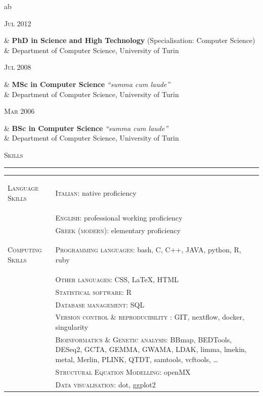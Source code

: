 \documentclass[a4paper,10pt]{article}
\newcommand{\mediumtitle}[1]{
	\vspace{0.2cm}
	{\noindent
	\Large \textsc{#1}\\[-2ex]
	\hrule
	\vspace{0.2cm}}
}
\newenvironment{doubletablelist}
{
	\begin{longtable}[!h]{AB}}{\end{longtable}
}
\newcommand{\dtlist}[2]{
\hspace{-3cm}
\noindent
	\begin{minipage}{0.22\textwidth}
	\begin{flushright}
	\textsc{#1}
	\end{flushright}
	\end{minipage}
	& #2 \medskip \\ 
}
\newenvironment{singletablelist}
{	
	\begin{longtable}[!h]{ab}}{\end{longtable}
}
\newcommand{\stlist}[2]{
	\hspace{-3cm}
	\noindent
	\begin{minipage}{0.24\textwidth}
	\begin{flushright}
	\textsc{#1}
	\end{flushright}
	\end{minipage}
	& #2 \medskip \\ 
}
\begin{document}
\begin{singletablelist}

	\stlist{Jul 2012}{\textbf{PhD in Science and High Technology} (Specialisation: Computer Science) \\
	& Department of Computer Science, University of Turin
	}
	
	\stlist{Jul 2008}{\textbf{MSc in Computer Science} \emph{``summa cum laude''} \\
	& Department of Computer Science, University of Turin
	}

	\stlist{Mar 2006}{\textbf{BSc in Computer Science}  \emph{``summa cum laude''} \\
	& Department of Computer Science, University of Turin
	}

\end{singletablelist}


\mediumtitle{Skills}

\begin{doubletablelist}
	\dtlist{Language Skills}{\textsc{Italian}: native proficiency \\ 
							&\textsc{English}: professional working proficiency\\
							&\textsc{Greek (modern)}: elementary proficiency}
	\dtlist{Computing Skills}{\textsc{Programming languages}: bash, C, C++, JAVA, python, R, ruby \\ %
							&\textsc{Other languages}: CSS, \LaTeX, HTML\\ %
							&\textsc{Statistical software}: R\\ %
							&\textsc{Database management}: SQL\\
							&\textsc{Version control \& reproducibility }: GIT, nextflow, docker, singularity\\
							&\textsc{Bioinformatics \& Genetic analysis}: BBmap, BEDTools, DESeq2, GCTA, GEMMA, GWAMA, LDAK, limma, lmekin, metal, Merlin, PLINK, QTDT, samtools, vcftools, \dots\\
							&\textsc{Structural Equation Modelling}: openMX\\ %
							&\textsc{Data visualisation}: dot, ggplot2}
\end{doubletablelist}
\end{document}
